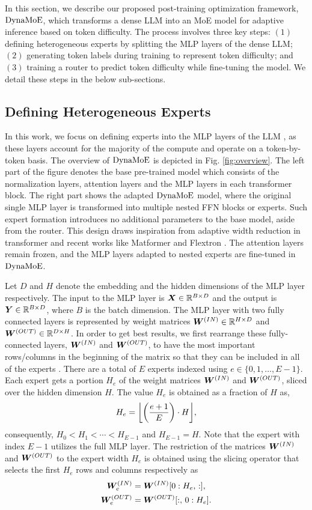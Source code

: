 In this section, we describe our proposed post-training optimization framework, $\operatorname{DynaMoE}$, which transforms a dense LLM into an MoE model for adaptive inference based on token difficulty. The process involves three key steps: $(1)$ defining heterogeneous experts by splitting the MLP layers of the dense LLM; $(2)$ generating token labels during training to represent token difficulty; and $(3)$ training a router to predict token difficulty while fine-tuning the model. We detail these steps in the below sub-sections.

\subsection{Defining Heterogeneous Experts}
In this work, we focus on defining experts into the MLP layers of the LLM \cite{Devvrit2023MatFormerNT}, as these layers account for the majority of the compute and operate on a token-by-token basis. The overview of $\operatorname{DynaMoE}$ is depicted in Fig. \ref{fig:overview}. The left part of the figure denotes the base pre-trained model which consists of the normalization layers, attention layers and the MLP layers in each transformer block. The right part shows the adapted $\operatorname{DynaMoE}$ model, where the original single MLP layer is transformed into multiple nested FFN blocks or experts. Such expert formation introduces no additional parameters to the base model, aside from the router. This design draws inspiration from adaptive width reduction in transformer \cite{Salehi2023SHARCSET} and recent works like Matformer \cite{Devvrit2023MatFormerNT} and Flextron \cite{Cai2024FlextronMF}. The attention layers remain frozen, and the MLP layers adapted to nested experts are fine-tuned in $\operatorname{DynaMoE}$.

Let $D$ and $H$ denote the embedding and the hidden dimensions of the MLP layer respectively. The input to the MLP layer is $\bm{X} \in \mathbb{R}^{B \times D}$ and the output is $\bm{Y} \in \mathbb{R}^{B \times D}$, where $B$ is the batch dimension. The MLP layer with two fully connected layers is represented by weight matrices $\bm{W}^{(IN)} \in \mathbb{R}^{H \times D}$ and $\bm{W}^{(OUT)} \in \mathbb{R}^{D \times H}$. In order to get best results, we first rearrange these fully-connected layers,  $\bm{W}^{(IN)}$ and $\bm{W}^{(OUT)}$, to have the most important rows/columns in the beginning of the matrix so that they can be included in all of the experts \cite{Samragh2023WeightSD}. There are a total of $E$ experts indexed using $e \in  \{0, 1, \ldots, E-1\}$. Each expert gets a portion $H_e$ of the weight matrices $\bm{W}^{(IN)}$ and $\bm{W}^{(OUT)}$, sliced over the hidden dimension $H$. The value $H_e$ is obtained as a fraction of $H$ as, 
\begin{equation}
    H_e = \floor*{\bp{\frac{e+1}{E}}\cdot H},
\end{equation}
consequently, $H_0 < H_1 < \cdots < H_{E-1}$ and $H_{E-1}=H$. Note that the expert with index $E-1$ utilizes the full MLP layer. The restriction of the matrices $\bm{W}^{(IN)}$ and $\bm{W}^{(OUT)}$ to the expert width $H_e$ is obtained using the slicing operator that selects the first $H_e$ rows and columns respectively as 
\begin{align}
    \bm{W}^{(IN)}_e &= \bm{W}^{(IN)}[0:H_e,\, :], \\
    \bm{W}^{(OUT)}_e &= \bm{W}^{(OUT)}[:,\, 0:H_e].
\end{align}
    
